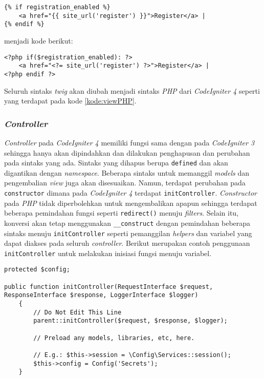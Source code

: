 \begin{lstlisting}[caption=Contoh \textit{view} menggunakan \textit{twig}, label=kode:viewTwig]
{% if registration_enabled %}
	<a href="{{ site_url('register') }}">Register</a> |
{% endif %}
\end{lstlisting}

menjadi kode berikut:

\begin{lstlisting}[caption=Contoh \textit{view} menggunakan \textit{php}, label=kode:viewPHP]
<?php if($registration_enabled): ?>
	<a href="<?= site_url('register') ?>">Register</a> |
<?php endif ?>
\end{lstlisting}

Seluruh sintaks \textit{twig} akan diubah menjadi sintaks \textit{PHP} dari \textit{CodeIgniter 4} seperti yang terdapat pada kode \ref{kode:viewPHP}.

\subsubsection{\textit{Controller}}
\textit{Controller} pada \textit{CodeIgniter 4} memiliki fungsi sama dengan pada \textit{CodeIgniter 3} sehingga hanya akan dipindahkan dan dilakukan penghapusan dan perubahan pada sintaks yang ada. Sintaks yang dihapus berupa \texttt{defined} dan akan digantikan dengan \textit{namespace}. Beberapa sintaks untuk memanggil \textit{models} dan pengembalian \textit{view} juga akan disesuaikan. Namun, terdapat perubahan pada \texttt{constructor} dimana pada \textit{CodeIgniter 4} terdapat \texttt{initController}. \textit{Constructor} pada \textit{PHP} tidak diperbolehkan untuk mengembalikan apapun sehingga terdapat beberapa pemindahan fungsi seperti \texttt{redirect()} menuju \textit{filters}. Selain itu, konversi akan tetap menggunakan \verb|__construct| dengan pemindahan beberapa sintaks menuju \texttt{initController} seperti pemanggilan \textit{helpers} dan variabel yang dapat diakses pada seluruh \textit{controller}. Berikut merupakan contoh penggunaan \texttt{initController} untuk melakukan inisiasi fungsi menuju variabel.

\begin{lstlisting}[caption=Penggunaan initController untuk inisiasi fungsi menuju variabel, label=kode:initController]
protected $config;

public function initController(RequestInterface $request, ResponseInterface $response, LoggerInterface $logger)
    {
        // Do Not Edit This Line
        parent::initController($request, $response, $logger);

        // Preload any models, libraries, etc, here.

        // E.g.: $this->session = \Config\Services::session();
        $this->config = Config('Secrets');
    }
\end{lstlisting}

